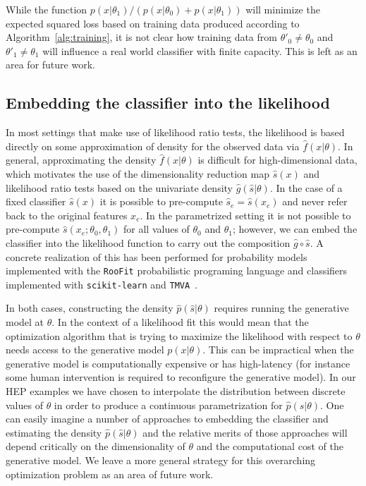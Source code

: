 \documentclass{article} %
\begin{document}
While the function $p(x|\theta_1)/(p(x|\theta_0)+p(x|\theta_1))$ will minimize the expected squared loss based on 
training data produced according to Algorithm~\ref{alg:training}, it is not clear how training data from $\theta'_0 \ne \theta_0$ and $\theta'_1 \ne \theta_1$ will influence a real world classifier with finite capacity. This is left as an area for future work.

\subsection{Embedding the classifier into the likelihood}

In most settings that make use of likelihood ratio tests, the likelihood is based directly on some approximation of density for the observed data via $\hat{f}(x|\theta)$.  In general, approximating the density $\hat{f}(x|\theta)$ is difficult for high-dimensional data, which motivates the use of the dimensionality reduction map $\hat{s}(x)$ and likelihood ratio tests based on the univariate density $\hat{g}(\hat{s}|\theta)$.  In the case of a fixed classifier $\hat s(x)$ it is possible to pre-compute $\hat s_e=\hat s(x_e)$ and never refer back to the original features $x_e$. In the parametrized setting it is not possible to pre-compute $\hat s(x_e; \theta_0, \theta_1)$ for all values of $\theta_0$ and $\theta_1$; however, we can  embed the classifier into the likelihood function to carry out the composition $\hat{g}\circ \hat{s}$. A concrete realization of this has been performed for probability models implemented with the \texttt{RooFit} probabilistic programing language and  classifiers implemented with \texttt{scikit-learn} and \texttt{TMVA}~\cite{Verkerke:2003ir,scikit-learn,Hocker:2007ht}.

In both cases, constructing the density $\hat p(\hat s|\theta)$ requires running the generative model at $\theta$. In the context of a likelihood fit this would mean that the optimization algorithm that is trying to maximize the likelihood with respect to $\theta$ needs access to the generative model $p(x|\theta)$. This can be  impractical when the generative model is computationally expensive or has high-latency (for instance some human intervention is required to reconfigure the generative model).  In our HEP examples we have chosen to interpolate the distribution between discrete values of $\theta$ in order to produce a continuous parametrization for $\hat p(\hat s | \theta)$. 
One can easily imagine a number of approaches to embedding the classifier and estimating the density $\hat p(\hat s|\theta)$ and the relative merits of those approaches will depend critically on the dimensionality of $\theta$ and the computational cost of the generative model. We leave a more general strategy for this overarching optimization problem as an area of future work.
\end{document}
